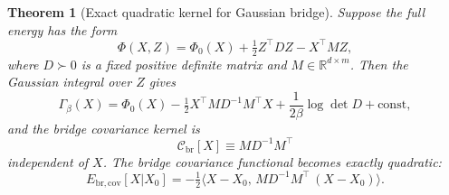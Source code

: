 \documentclass[12pt]{article}
\theoremstyle{plain}
\newtheorem{theorem}{Theorem}[section]
\theoremstyle{definition}
\numberwithin{equation}{section}
\newcommand{\R}{\mathbb{R}}
\newcommand{\br}{\mathrm{br}}
\begin{document}
\begin{theorem}[Exact quadratic kernel for Gaussian bridge]\label{thm:gaussian}
Suppose the full energy has the form
\begin{equation}\label{eq:gaussenergy}
\Phi(X,Z) = \Phi_0(X) + \tfrac{1}{2}Z^\top DZ - X^\top MZ,
\end{equation}
where $D\succ 0$ is a fixed positive definite matrix and
$M\in\R^{d\times m}$.  Then the Gaussian integral over $Z$ gives
\begin{equation}\label{eq:gaussGamma}
\Gamma_\beta(X) = \Phi_0(X)
-\tfrac{1}{2}X^\top MD^{-1}M^\top X
+\frac{1}{2\beta}\log\det D + \mathrm{const},
\end{equation}
and the bridge covariance kernel is
\begin{equation}\label{eq:gausskernel}
\boxed{\mathcal{C}_{\br}[X] \equiv MD^{-1}M^\top}
\end{equation}
independent of $X$.  The bridge covariance functional becomes
exactly quadratic:
\begin{equation}\label{eq:gaussfunctional}
E_{\br,\mathrm{cov}}[X|X_0]
= -\tfrac{1}{2}\langle X-X_0,\,MD^{-1}M^\top\,(X-X_0)\rangle.
\end{equation}
\end{theorem}
\end{document}
